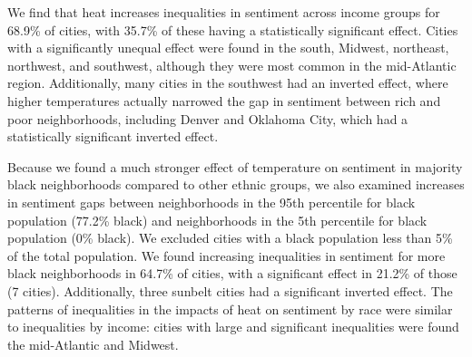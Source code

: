 \documentclass[fleqn,10pt]{wlscirep}
\begin{document}
We find that heat increases inequalities in sentiment across income groups for 68.9\% of cities, with 35.7\% of these having a statistically significant effect.  Cities with a significantly unequal effect were found in the south, Midwest, northeast, northwest, and southwest, although they were most common in the mid-Atlantic region.  Additionally, many cities in the southwest had an inverted effect, where higher temperatures actually narrowed the gap in sentiment between rich and poor neighborhoods, including Denver and Oklahoma City, which had a statistically significant inverted effect.

Because we found a much stronger effect of temperature on sentiment in majority black neighborhoods compared to other ethnic groups, we also examined increases in sentiment gaps between neighborhoods in the 95th percentile for black population (77.2\% black) and neighborhoods in the 5th percentile for black population (0\% black).  We excluded cities with a black population less than 5\% of the total population.  We found increasing inequalities in sentiment for more black neighborhoods in 64.7\% of cities, with a significant effect in 21.2\% of those (7 cities).  Additionally, three sunbelt cities had a significant inverted effect.  The patterns of inequalities in the impacts of heat on sentiment by race were similar to inequalities by income: cities with large and significant inequalities were found the mid-Atlantic and Midwest.
\end{document}
